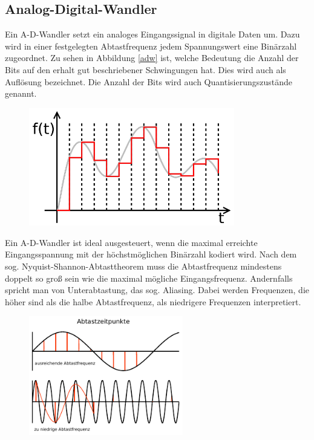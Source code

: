 \subsection{Analog-Digital-Wandler}

Ein A-D-Wandler setzt ein analoges Eingangssignal in digitale Daten um. Dazu wird in einer festgelegten Abtastfrequenz jedem Spannungswert eine Binärzahl zugeordnet.
Zu sehen in Abbildung \ref{adw} ist, welche Bedeutung die Anzahl der Bits auf den erhalt gut beschriebener Schwingungen hat. Dies wird auch als Auflösung bezeichnet. Die Anzahl der Bits wird auch Quantisierungszustände genannt.
\begin{figure}[H]
     \centering     
     \includegraphics[width=0.8\textwidth]{Abb/adw.pdf}
\end{figure}
Ein A-D-Wandler ist ideal ausgesteuert, wenn die maximal erreichte Eingangsspannung mit der höchstmöglichen Binärzahl kodiert wird. 
Nach dem sog. Nyquist-Shannon-Abtasttheorem muss die Abtastfrequenz mindestens doppelt so groß sein wie die maximal mögliche Eingangsfrequenz. Andernfalls spricht man von Unterabtastung, das sog. Aliasing. Dabei werden Frequenzen, die höher sind als die halbe Abtastfrequenz, als niedrigere Frequenzen interpretiert.
\begin{figure}[H]
    \centering
    \includegraphics[width=0.6\textwidth]{Abb/abtast.pdf} 
\end{figure}

